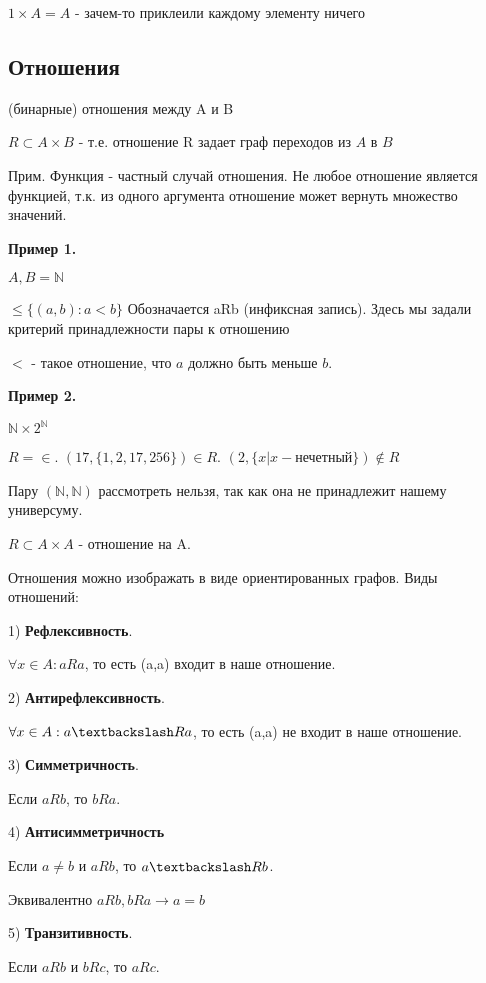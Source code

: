 $1 \times A = A$ - зачем-то приклеили  каждому элементу ничего

\subsection*{Отношения}

(бинарные) отношения между A и B

$R \subset A \times B$ - т.е. отношение R задает граф переходов из $A$ в $B$

Прим. Функция - частный случай отношения. Не любое отношение является функцией, т.к. из одного аргумента отношение может вернуть множество значений.

\textbf{Пример 1.}

$A,B = \mathds{N}$

$\le \{(a,b): a<b\}$ Обозначается aRb (инфиксная запись). Здесь мы задали критерий принадлежности пары к отношению

$<$ - такое отношение, что $a$ должно быть меньше $b$.

\textbf{Пример 2.}

$\mathds{N} \times 2^\mathds{N}$

$R = \in $. $(17, \{1, 2, 17, 256\}) \in R$. $(2, \{x | x - \text{нечетный}\}) \notin R$

Пару $(\mathds{N}, \mathds{N})$ рассмотреть нельзя, так как она не принадлежит нашему универсуму.



$R \subset A \times A$ - отношение на A.

Отношения можно изображать в виде ориентированных графов.
Виды отношений: 

1) \textbf{Рефлексивность}.

$\forall x \in A: aRa$, то есть (a,a) входит в наше отношение.

2) \textbf{Антирефлексивность}.

$\forall x \in A: a\textbackslash Ra$, то есть (a,a) не входит в наше отношение.

3) \textbf{Симметричность}.

Если $aRb$, то $bRa$.

4) \textbf{Антисимметричность} 

Если $a\neq b$ и $aRb$, то $a\textbackslash Rb$.

Эквивалентно $aRb, bRa \rightarrow a=b$

5) \textbf{Транзитивность}.

Если $aRb$ и $bRc$, то $aRc$.

